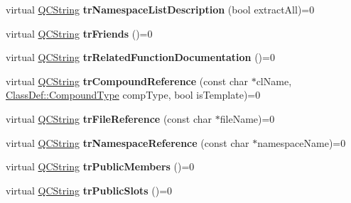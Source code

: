 \begin{DoxyCompactItemize}
\item 
\hypertarget{class_translator_a0436e32ac648cab03b1cf568cc1f6de8}{virtual \hyperlink{class_q_c_string}{Q\-C\-String} {\bfseries tr\-Namespace\-List\-Description} (bool extract\-All)=0}\label{class_translator_a0436e32ac648cab03b1cf568cc1f6de8}

\item 
\hypertarget{class_translator_ac5fd66ba2955bb25cf703556ea9b09eb}{virtual \hyperlink{class_q_c_string}{Q\-C\-String} {\bfseries tr\-Friends} ()=0}\label{class_translator_ac5fd66ba2955bb25cf703556ea9b09eb}

\item 
\hypertarget{class_translator_a49affc9cb6a2cdc037bf699deb601b64}{virtual \hyperlink{class_q_c_string}{Q\-C\-String} {\bfseries tr\-Related\-Function\-Documentation} ()=0}\label{class_translator_a49affc9cb6a2cdc037bf699deb601b64}

\item 
\hypertarget{class_translator_a8c6a74202ba967c79f5d9ed79ca00e3e}{virtual \hyperlink{class_q_c_string}{Q\-C\-String} {\bfseries tr\-Compound\-Reference} (const char $\ast$cl\-Name, \hyperlink{class_class_def_a768a6f0a6fd7e9087ff7971abbcc3f36}{Class\-Def\-::\-Compound\-Type} comp\-Type, bool is\-Template)=0}\label{class_translator_a8c6a74202ba967c79f5d9ed79ca00e3e}

\item 
\hypertarget{class_translator_af722a392d8b77163513045cd005af036}{virtual \hyperlink{class_q_c_string}{Q\-C\-String} {\bfseries tr\-File\-Reference} (const char $\ast$file\-Name)=0}\label{class_translator_af722a392d8b77163513045cd005af036}

\item 
\hypertarget{class_translator_ab43d665ef672bc950891637cc52edfae}{virtual \hyperlink{class_q_c_string}{Q\-C\-String} {\bfseries tr\-Namespace\-Reference} (const char $\ast$namespace\-Name)=0}\label{class_translator_ab43d665ef672bc950891637cc52edfae}

\item 
\hypertarget{class_translator_a5973393e31cd79b6fbaebbed09f854e1}{virtual \hyperlink{class_q_c_string}{Q\-C\-String} {\bfseries tr\-Public\-Members} ()=0}\label{class_translator_a5973393e31cd79b6fbaebbed09f854e1}

\item 
\hypertarget{class_translator_a7e35ac45fc776084f1aa05fee2387a8f}{virtual \hyperlink{class_q_c_string}{Q\-C\-String} {\bfseries tr\-Public\-Slots} ()=0}\label{class_translator_a7e35ac45fc776084f1aa05fee2387a8f}


\end{DoxyCompactItemize}
